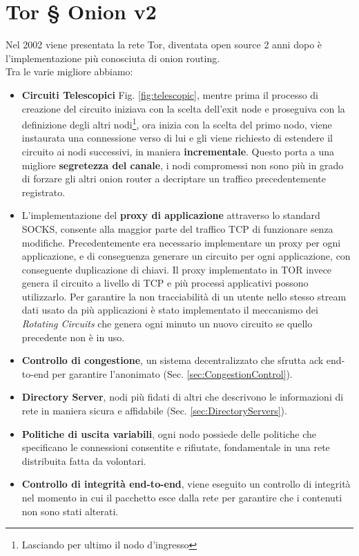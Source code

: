 \newpage
\chapter{Tor § Onion v2}
\label{chap:Capitolo2}
Nel 2002 viene presentata la rete Tor, diventata open source 2 anni dopo è l'implementazione più conosciuta di onion routing. \\
Tra le varie migliore abbiamo:
\begin{itemize}
    \item \textbf{Circuiti Telescopici} Fig. \ref{fig:telescopic}, mentre prima il processo di creazione del circuito iniziava con la scelta dell'exit node e proseguiva con la definizione degli altri nodi\footnote{Lasciando per ultimo il nodo d'ingresso}, ora inizia con la scelta del primo nodo, viene instaurata una connessione verso di lui e gli viene richiesto di estendere il circuito ai nodi successivi, in maniera \textbf{incrementale}. Questo porta a una migliore \textbf{segretezza del canale}, i nodi compromessi non sono più in grado di forzare gli altri onion router a decriptare un traffico precedentemente registrato.
    
    \item L'implementazione del \textbf{proxy di applicazione} attraverso lo standard SOCKS, consente alla maggior parte del traffico TCP di funzionare senza modifiche. Precedentemente era necessario implementare un proxy per ogni applicazione, e di conseguenza generare un circuito per ogni applicazione, con conseguente duplicazione di chiavi. Il proxy implementato in TOR invece genera il circuito a livello di TCP e più processi applicativi possono utilizzarlo. Per garantire la non tracciabilità di un utente nello stesso stream dati usato da più applicazioni è stato implementato il meccanismo dei \emph{Rotating Circuits} che genera ogni minuto un nuovo circuito se quello precedente non è in uso.
    
    \item \textbf{Controllo di congestione}, un sistema decentralizzato che sfrutta ack end-to-end per garantire l'anonimato (Sec. \ref{sec:CongestionControl}).
    \item \textbf{Directory Server}, nodi più fidati di altri che descrivono le informazioni di rete in maniera sicura e affidabile (Sec. \ref{sec:DirectoryServers}).
    \item \textbf{Politiche di uscita variabili}, ogni nodo possiede delle politiche che specificano le connessioni consentite e rifiutate, fondamentale in una rete distribuita fatta da volontari.
    \item \textbf{Controllo di integrità end-to-end}, viene eseguito un controllo di integrità nel momento in cui il pacchetto esce dalla rete per garantire che i contenuti non sono stati alterati.
\end{itemize}

